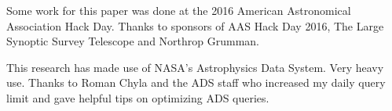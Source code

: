 \documentclass[preprint2]{aastex}
\begin{document}
\acknowledgments
Some work for this paper was done at the 2016 American Astronomical Association Hack Day. Thanks to sponsors of AAS Hack Day 2016, The Large Synoptic Survey Telescope and Northrop Grumman.

This research has made use of NASA's Astrophysics Data System. Very heavy use. Thanks to Roman Chyla and the ADS staff who increased my daily query limit and gave helpful tips on optimizing ADS queries.





\end{document}
